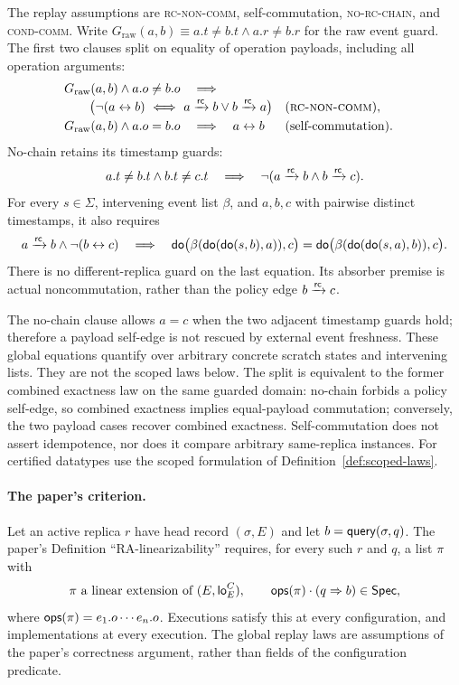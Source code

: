 \begin{definition}
\label{def:guards}
The replay assumptions are \textsc{rc-non-comm}, self-commutation,
\textsc{no-rc-chain}, and \textsc{cond-comm}. Write
$G_{\mathrm{raw}}(a,b)\equiv a.t\ne b.t\land a.r\ne b.r$ for the raw event guard.
The first two clauses split on equality of operation payloads, including
all operation arguments:
\begin{align*}
&G_{\mathrm{raw}}(a,b)\land a.o\ne b.o\quad\Longrightarrow\\[-3pt]
&\qquad\bigl(\neg(a\leftrightarrow b)\ \Longleftrightarrow\
 a\xrightarrow{\mathsf{rc}}b\lor b\xrightarrow{\mathsf{rc}}a\bigr)
 &&\text{(\textsc{rc-non-comm})},\\
&G_{\mathrm{raw}}(a,b)\land a.o=b.o\quad\Longrightarrow\quad a\leftrightarrow b
 &&\text{(self-commutation)}.
\end{align*}
No-chain retains its timestamp guards:
\[
 a.t\ne b.t\land b.t\ne c.t\quad\Longrightarrow\quad
 \neg(a\xrightarrow{\mathsf{rc}}b\land b\xrightarrow{\mathsf{rc}}c).
\]
For every $s\in\Sigma$, intervening event list $\beta$, and $a,b,c$ with
pairwise distinct timestamps, it also requires
\[
 a\xrightarrow{\mathsf{rc}}b\land\neg(b\leftrightarrow c)\quad\Longrightarrow\quad
 \mathsf{do}\bigl(\beta(\mathsf{do}(\mathsf{do}(s,b),a)),c\bigr)
 =\mathsf{do}\bigl(\beta(\mathsf{do}(\mathsf{do}(s,a),b)),c\bigr).
\]
There is no different-replica guard on the last equation. Its absorber premise
is actual noncommutation, rather than the policy edge $b\xrightarrow{\mathsf{rc}}c$.
\end{definition}
The no-chain clause allows $a=c$ when the two adjacent timestamp guards hold;
therefore a payload self-edge is not rescued by external event freshness.
These global equations quantify over arbitrary concrete scratch states and
intervening lists. They are not the scoped laws below.
The split is equivalent to the former combined exactness law on the same
guarded domain: no-chain forbids a policy self-edge, so combined exactness
implies equal-payload commutation; conversely, the two payload cases recover
combined exactness. Self-commutation does not assert idempotence, nor does it
compare arbitrary same-replica instances. For certified datatypes use the
scoped formulation of Definition~\ref{def:scoped-laws}.

\paragraph{The paper's criterion.}
Let an active replica $r$ have head record $(\sigma,E)$ and let
$b=\mathsf{query}(\sigma,q)$. The paper's Definition
``RA-linearizability'' requires, for every such $r$ and $q$, a list $\pi$ with
\[
 \pi\text{ a linear extension of }(E,\mathsf{lo}^{C}_{E}),\qquad
 \mathsf{ops}(\pi)\cdot(q\Rightarrow b)\in\mathsf{Spec},
\]
where $\mathsf{ops}(\pi)=e_1.o\cdots e_n.o$. Executions satisfy this at every
configuration, and implementations at every execution. The global replay laws are assumptions of the paper's correctness argument,
rather than fields of the configuration predicate.

